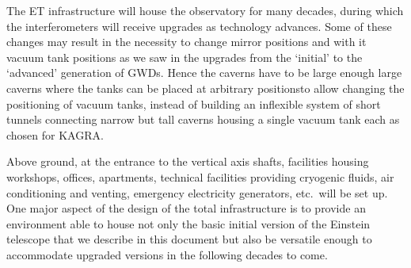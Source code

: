 The ET infrastructure will house the observatory for many decades, during which the interferometers will receive upgrades as technology advances. Some of these changes may result in the necessity to change mirror positions and with it vacuum tank positions as we saw in the upgrades from the `initial' to the `advanced' generation of GWDs. Hence the caverns have to be large enough large caverns where the tanks can be placed at arbitrary positionsto allow changing the positioning of vacuum tanks, instead of building an inflexible system of short tunnels connecting narrow but tall caverns housing a single vacuum tank each as chosen for KAGRA.  

Above ground, at the entrance to the vertical axis shafts, facilities housing workshops, offices, apartments, technical facilities providing cryogenic fluids, air conditioning and venting, emergency electricity generators, etc.\ will be set up. 
One major aspect of the design of the total infrastructure is to provide an environment able to house not only the basic initial version of the Einstein telescope that we describe in this document but also be versatile enough to accommodate upgraded versions in the following decades to come.   

